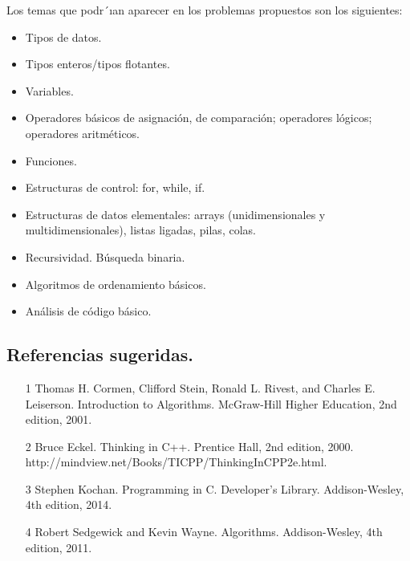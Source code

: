 \documentclass[10pt,a4paper]{book}
\begin{document}
Los temas que podr´ıan aparecer en los problemas propuestos son los siguientes:
\begin{itemize}
	\item Tipos de datos. 
	\item Tipos enteros/tipos flotantes.
	\item Variables.
	\item Operadores básicos de asignación, de comparación; operadores lógicos; operadores aritméticos.
	\item Funciones.
	\item Estructuras de control: for, while, if.
	\item Estructuras de datos elementales: arrays (unidimensionales y multidimensionales), listas ligadas, pilas, colas.
	\item Recursividad. Búsqueda binaria.
	\item Algoritmos de ordenamiento básicos.
	\item Análisis de código básico.
\end{itemize}

\subsection{Referencias sugeridas.}
\begin{itemize}
\item [1] Thomas H. Cormen, Clifford Stein, Ronald L. Rivest, and Charles E. Leiserson. Introduction to Algorithms. McGraw-Hill Higher Education, 2nd edition, 2001.
\item [2] Bruce Eckel. Thinking in C++. Prentice Hall, 2nd edition, 2000. http://mindview.net/Books/TICPP/ThinkingInCPP2e.html.
\item [3] Stephen Kochan. Programming in C. Developer’s Library. Addison-Wesley, 4th edition, 2014.
\item [4] Robert Sedgewick and Kevin Wayne. Algorithms. Addison-Wesley, 4th edition, 2011.
\end{itemize}
\end{document}
